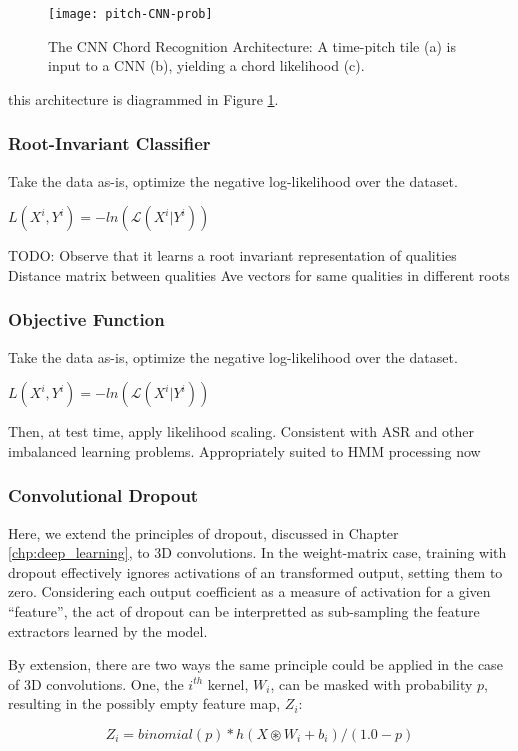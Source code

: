\begin{figure}[!t]
\centering
\texttt{[image: pitch-CNN-prob]}
\caption{The CNN Chord Recognition Architecture: A time-pitch tile (a) is input to a CNN (b), yielding a chord likelihood (c).}
\label{fig:system}
\end{figure}

this architecture is diagrammed in Figure \ref{fig:system}.


\subsubsection{Root-Invariant Classifier}
Take the data as-is, optimize the negative log-likelihood over the dataset.

$L(X^i, Y^i) = -ln(\mathcal{L}(X^i|Y^i))$

TODO: Observe that it learns a root invariant representation of qualities
Distance matrix between qualities
Ave vectors for same qualities in different roots


\subsubsection{Objective Function}
Take the data as-is, optimize the negative log-likelihood over the dataset.

$L(X^i, Y^i) = -ln(\mathcal{L}(X^i|Y^i))$

Then, at test time, apply likelihood scaling.
Consistent with ASR and other imbalanced learning problems.
Appropriately suited to HMM processing now


\subsubsection{Convolutional Dropout}
Here, we extend the principles of dropout, discussed in Chapter \ref{chp:deep_learning}, to 3D convolutions.
In the weight-matrix case, training with dropout effectively ignores activations of an transformed output, setting them to zero.
Considering each output coefficient as a measure of activation for a given ``feature'', the act of dropout can be interpretted as sub-sampling the feature extractors learned by the model.

By extension, there are two ways the same principle could be applied in the case of 3D convolutions.
One, the $i^{th}$ kernel, $W_i$, can be masked with probability $p$, resulting in the possibly empty feature map, $Z_i$:

\begin{equation}
Z_i = binomial(p) * h(X \circledast W_i + b_i) / (1.0 - p)
\end{equation}

